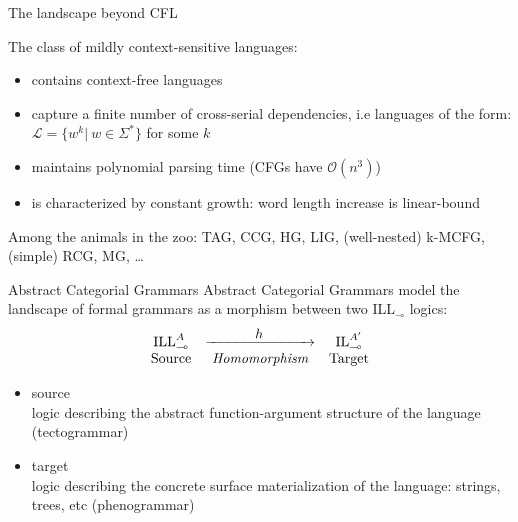 \documentclass{beamer}
\begin{document}
\begin{frame}{The landscape beyond CFL}
	\small 
	
	The class of \alert{mildly context-sensitive languages}:
	\begin{itemize}
		\item contains context-free languages
		\item capture a finite number of cross-serial dependencies, i.e languages of the form: $\mathcal{L} = \{w^k | \ w \in \Sigma^*\}$ for some $k$
		\item maintains polynomial parsing time (CFGs have $\mathcal{O}(n^3)$)
		\item is characterized by constant growth: word length increase is linear-bound
	\end{itemize}
	\vfill
	
	Among the animals in the zoo: TAG, CCG, HG, LIG, (well-nested) k-MCFG, (simple) RCG, MG, \dots
\end{frame}

\begin{frame}{Abstract Categorial Grammars}
	\small
	\alert{Abstract Categorial Grammars} model the landscape of formal grammars as a morphism between two ILL${}_\multimap$ logics:
	\[
		\begin{array}{@{}c@{\quad}c@{\quad}c@{}}
			\text{ILL}_\multimap^A & \xrightarrow{\makebox[1in]{$h$}} & \text{IL}_\multimap^{A^\prime}\\
			\text{Source} & \textit{Homomorphism} & \text{Target}
		\end{array}
	\]
	\begin{itemize}
		\item source\\
		logic describing the abstract function-argument structure of the language (tectogrammar)
		\item target\\
		logic describing the concrete surface materialization of the language: strings, trees, etc (phenogrammar)
	\end{itemize}
\end{frame}
\end{document}
